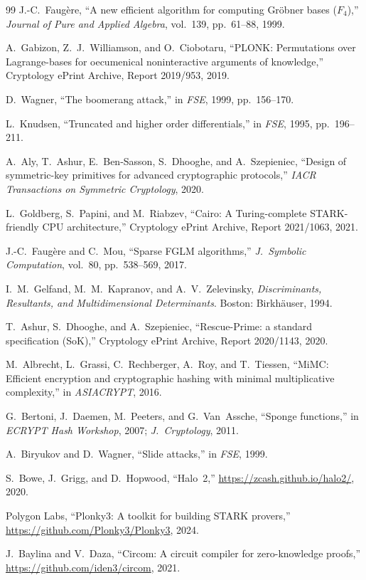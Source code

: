 \documentclass[11pt,a4paper]{article}
\theoremstyle{definition}
\begin{document}
\begin{thebibliography}{99}
J.-C.~Faug\`ere,
``A new efficient algorithm for computing Gr\"obner bases ($F_4$),''
\emph{Journal of Pure and Applied Algebra}, vol.~139, pp.~61--88, 1999.

A.~Gabizon, Z.~J.~Williamson, and O.~Ciobotaru,
``PLONK: Permutations over Lagrange-bases for oecumenical noninteractive arguments of knowledge,''
Cryptology ePrint Archive, Report 2019/953, 2019.

D.~Wagner,
``The boomerang attack,''
in \emph{FSE}, 1999, pp.~156--170.

L.~Knudsen,
``Truncated and higher order differentials,''
in \emph{FSE}, 1995, pp.~196--211.

A.~Aly, T.~Ashur, E.~Ben-Sasson, S.~Dhooghe, and A.~Szepieniec,
``Design of symmetric-key primitives for advanced cryptographic protocols,''
\emph{IACR Transactions on Symmetric Cryptology}, 2020.

L.~Goldberg, S.~Papini, and M.~Riabzev,
``Cairo: A Turing-complete STARK-friendly CPU architecture,''
Cryptology ePrint Archive, Report 2021/1063, 2021.

J.-C.~Faug\`ere and C.~Mou,
``Sparse FGLM algorithms,''
\emph{J.~Symbolic Computation}, vol.~80, pp.~538--569, 2017.

I.~M.~Gelfand, M.~M.~Kapranov, and A.~V.~Zelevinsky,
\emph{Discriminants, Resultants, and Multidimensional Determinants}.
Boston: Birkh\"auser, 1994.

T.~Ashur, S.~Dhooghe, and A.~Szepieniec,
``Rescue-Prime: a standard specification (SoK),''
Cryptology ePrint Archive, Report 2020/1143, 2020.

M.~Albrecht, L.~Grassi, C.~Rechberger, A.~Roy, and T.~Tiessen,
``MiMC: Efficient encryption and cryptographic hashing with minimal
multiplicative complexity,''
in \emph{ASIACRYPT}, 2016.

G.~Bertoni, J.~Daemen, M.~Peeters, and G.~Van~Assche,
``Sponge functions,''
in \emph{ECRYPT Hash Workshop}, 2007; \emph{J.\ Cryptology}, 2011.

A.~Biryukov and D.~Wagner,
``Slide attacks,''
in \emph{FSE}, 1999.

S.~Bowe, J.~Grigg, and D.~Hopwood,
``Halo~2,''
\url{https://zcash.github.io/halo2/}, 2020.

Polygon Labs,
``Plonky3: A toolkit for building STARK provers,''
\url{https://github.com/Plonky3/Plonky3}, 2024.

J.~Baylina and V.~Daza,
``Circom: A circuit compiler for zero-knowledge proofs,''
\url{https://github.com/iden3/circom}, 2021.

\end{thebibliography}
\end{document}
